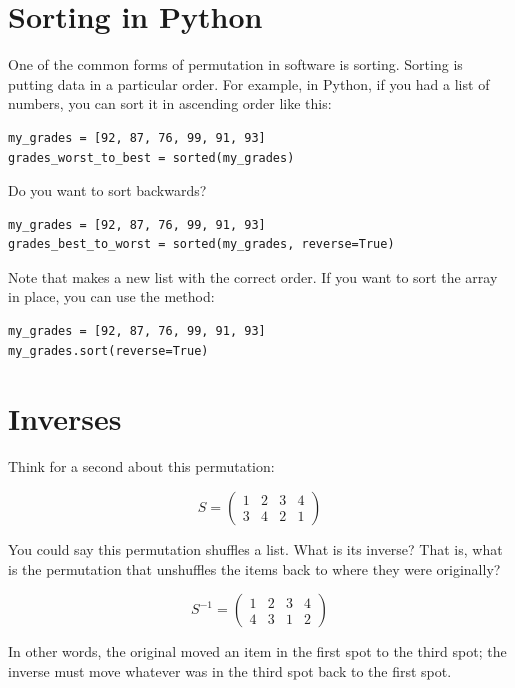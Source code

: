 \section{Sorting in Python}

One of the common forms of permutation in software is sorting.
Sorting is putting data in a particular order. For example, in Python,
if you had a list of numbers, you can sort it in ascending order like
this:

\begin{verbatim}
my_grades = [92, 87, 76, 99, 91, 93]
grades_worst_to_best = sorted(my_grades)
\end{verbatim}

Do you want to sort backwards?

\begin{verbatim}
my_grades = [92, 87, 76, 99, 91, 93]
grades_best_to_worst = sorted(my_grades, reverse=True)
\end{verbatim}

Note that  makes a new list with the correct
order. If you want to sort the array in place, you can use the
 method:

\begin{verbatim}
my_grades = [92, 87, 76, 99, 91, 93]
my_grades.sort(reverse=True)
\end{verbatim}

\section{Inverses}

Think for a second about this permutation:

$$S = \begin{pmatrix}
  1 & 2 & 3 & 4 \\
  3 & 4 & 2 & 1
\end{pmatrix}$$

You could say this permutation shuffles a list.  What is its
inverse? That is, what is the permutation that unshuffles the items
back to where they were originally?

$$S^{-1} = \begin{pmatrix}
  1 & 2 & 3 & 4 \\
  4 & 3 & 1 & 2
\end{pmatrix}$$

In other words, the original moved an item in the first spot to the third
spot; the inverse must move whatever was in the third spot back to
the first spot.

